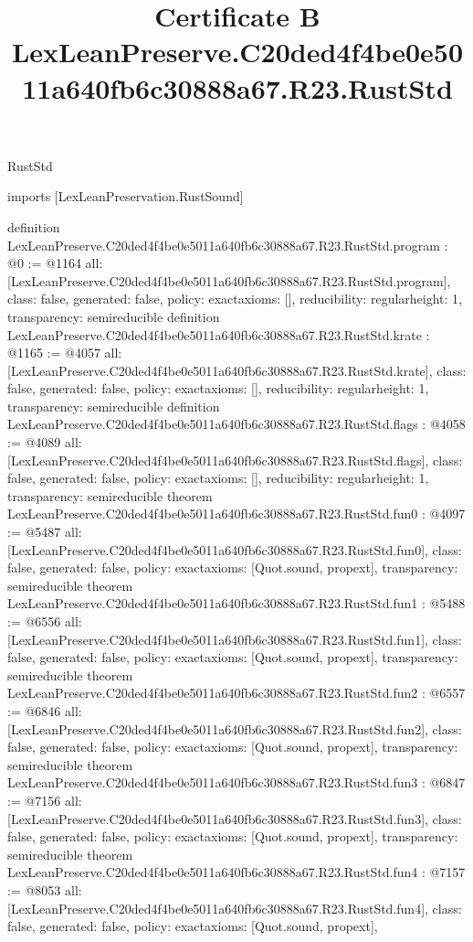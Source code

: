 \begin{lexlean}{RustStd}
\title{Certificate B LexLeanPreserve.C20ded4f4be0e5011a640fb6c30888a67.R23.RustStd}
\begin{coremodule}
imports [LexLeanPreservation.RustSound]

definition LexLeanPreserve.C20ded4f4be0e5011a640fb6c30888a67.R23.RustStd.program : @0 := @1164 {
  all: [LexLeanPreserve.C20ded4f4be0e5011a640fb6c30888a67.R23.RustStd.program],
  class: false,
  generated: false,
  policy: exact{axioms: []},
  reducibility: regular{height: 1},
  transparency: semireducible
}
definition LexLeanPreserve.C20ded4f4be0e5011a640fb6c30888a67.R23.RustStd.krate : @1165 := @4057 {
  all: [LexLeanPreserve.C20ded4f4be0e5011a640fb6c30888a67.R23.RustStd.krate],
  class: false,
  generated: false,
  policy: exact{axioms: []},
  reducibility: regular{height: 1},
  transparency: semireducible
}
definition LexLeanPreserve.C20ded4f4be0e5011a640fb6c30888a67.R23.RustStd.flags : @4058 := @4089 {
  all: [LexLeanPreserve.C20ded4f4be0e5011a640fb6c30888a67.R23.RustStd.flags],
  class: false,
  generated: false,
  policy: exact{axioms: []},
  reducibility: regular{height: 1},
  transparency: semireducible
}
theorem LexLeanPreserve.C20ded4f4be0e5011a640fb6c30888a67.R23.RustStd.fun0 : @4097 := @5487 {
  all: [LexLeanPreserve.C20ded4f4be0e5011a640fb6c30888a67.R23.RustStd.fun0],
  class: false,
  generated: false,
  policy: exact{axioms: [Quot.sound, propext]},
  transparency: semireducible
}
theorem LexLeanPreserve.C20ded4f4be0e5011a640fb6c30888a67.R23.RustStd.fun1 : @5488 := @6556 {
  all: [LexLeanPreserve.C20ded4f4be0e5011a640fb6c30888a67.R23.RustStd.fun1],
  class: false,
  generated: false,
  policy: exact{axioms: [Quot.sound, propext]},
  transparency: semireducible
}
theorem LexLeanPreserve.C20ded4f4be0e5011a640fb6c30888a67.R23.RustStd.fun2 : @6557 := @6846 {
  all: [LexLeanPreserve.C20ded4f4be0e5011a640fb6c30888a67.R23.RustStd.fun2],
  class: false,
  generated: false,
  policy: exact{axioms: [Quot.sound, propext]},
  transparency: semireducible
}
theorem LexLeanPreserve.C20ded4f4be0e5011a640fb6c30888a67.R23.RustStd.fun3 : @6847 := @7156 {
  all: [LexLeanPreserve.C20ded4f4be0e5011a640fb6c30888a67.R23.RustStd.fun3],
  class: false,
  generated: false,
  policy: exact{axioms: [Quot.sound, propext]},
  transparency: semireducible
}
theorem LexLeanPreserve.C20ded4f4be0e5011a640fb6c30888a67.R23.RustStd.fun4 : @7157 := @8053 {
  all: [LexLeanPreserve.C20ded4f4be0e5011a640fb6c30888a67.R23.RustStd.fun4],
  class: false,
  generated: false,
  policy: exact{axioms: [Quot.sound, propext]},
}
\end{coremodule}
\end{lexlean}
